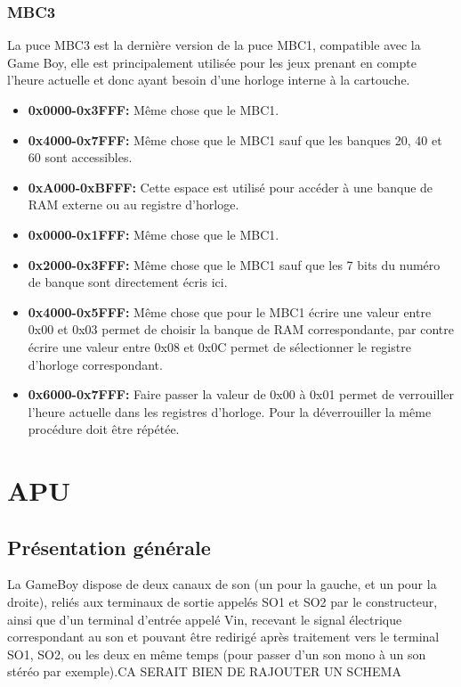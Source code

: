 \documentclass{report}
\begin{document}
\subsubsection{MBC3}
	La puce MBC3 est la dernière version de la puce MBC1, compatible avec la Game Boy, elle est principalement utilisée pour les jeux prenant en compte l'heure actuelle et donc ayant besoin d'une horloge interne à la cartouche.\\
\begin{itemize}
\item \textbf{0x0000-0x3FFF:} Même chose que le MBC1.\\
\item \textbf{0x4000-0x7FFF:} Même chose que le MBC1 sauf que les banques 20, 40 et 60 sont accessibles.\\
\item \textbf{0xA000-0xBFFF:} Cette espace est utilisé pour accéder à une banque de RAM externe ou au registre d'horloge.\\
\item \textbf{0x0000-0x1FFF:} Même chose que le MBC1.\\
\item \textbf{0x2000-0x3FFF:} Même chose que le MBC1 sauf que les 7 bits du numéro de banque sont directement écris ici.\\
\item \textbf{0x4000-0x5FFF:} Même chose que pour le MBC1 écrire une valeur entre 0x00 et 0x03 permet de choisir la banque de RAM correspondante, par contre écrire une valeur entre 0x08 et 0x0C permet de sélectionner le registre d'horloge correspondant.\\
\item \textbf{0x6000-0x7FFF:} Faire passer la valeur de 0x00 à 0x01 permet de verrouiller l'heure actuelle dans les registres d'horloge. Pour la déverrouiller la même procédure doit être répétée.\\ 
\end{itemize}


\section{APU}
\subsection{Présentation générale}
	La GameBoy dispose de deux canaux de son (un pour la gauche,
	et un pour la droite), reliés aux terminaux de sortie appelés
	SO1 et SO2 par le constructeur, ainsi que d'un terminal
	d'entrée appelé Vin, recevant le signal électrique
	correspondant au son et pouvant être redirigé après
	traitement vers le terminal SO1, SO2, ou les deux en même
	temps (pour passer d'un son mono à un son stéréo par
	exemple).CA SERAIT BIEN DE RAJOUTER UN SCHEMA\\
\end{document}
